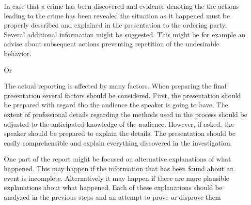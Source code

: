 In case that a crime has been discovered and evidence denoting the the actions leading to the crime has been revealed the situation as it happened must be properly described and explained in the presentation to the ordering party. Several additional information might be suggested. This might be for example an advise about subsequent actions preventing repetition of the undesirable behavior.

Or 





The actual reporting is affected by many factors. When preparing the final presentation several factors should be considered. First, the presentation should be prepared with regard tho the audience the speaker is going to have. The extent of professional details regarding the methods used in the process should be adjusted to the anticipated knowledge of the audience. However, if asked, the speaker should be prepared to explain the details. The presentation should be easily comprehensible and explain everything discovered in the investigation. 

One part of the report might be focused on alternative explanations of what happened. This may happen if the information that has been found about an event is incomplete. Alternatively it may happen if there are more plausible explanations about what happened. Each of these explanations should be analyzed in the previous steps and an attempt to prove or disprove them




